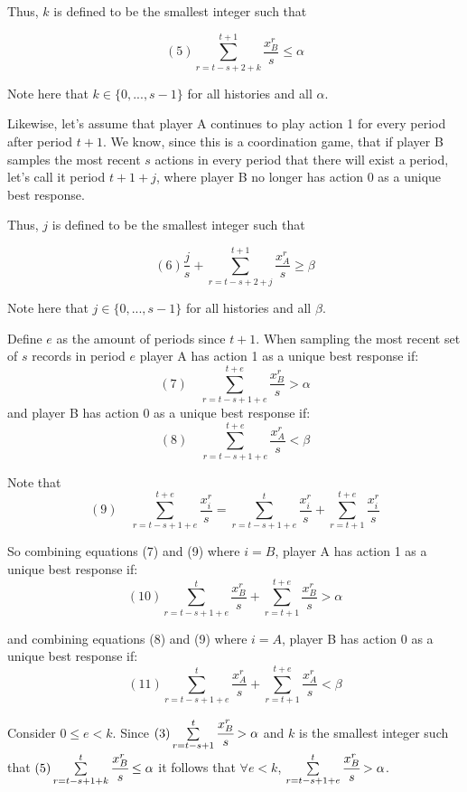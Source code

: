 \documentclass{article}
\begin{document}
Thus, $k$ is defined to be the smallest integer such that

$$(5) \sum\limits_{r=t-s+2+k}^{t+1} \frac{x^r_B}{s} \leq \alpha$$

Note here that $k \in \{0,...,s-1\}$ for all histories and all $\alpha$.

\vskip12pt

Likewise, let's assume that player A continues to play action 1 for every period after period $t+1$. We know, since this is a coordination game, that if player B samples the most recent $s$ actions in every period that there will exist a period, let's call it period $t+1+j$, where player B no longer has action 0 as a unique best response.

\vskip12pt

Thus, $j$ is defined to be the smallest integer such that

$$(6) \frac{j}{s}+\sum\limits_{r=t-s+2+j}^{t+1} \frac{x^r_A}{s} \geq \beta$$

Note here that $j \in \{0,...,s-1\}$ for all histories and all $\beta$.

\vskip12pt

Define $e$ as the amount of periods since $t+1$. When sampling the most recent set of $s$ records in period $e$ player A has action 1 as a unique best response if: 
$$(7) \hspace{12pt} \sum\limits_{r=t-s+1+e}^{t+e} \frac{x^r_B}{s} > \alpha$$
and player B has action 0 as a unique best response if:
$$(8) \hspace{12pt} \sum\limits_{r=t-s+1+e}^{t+e} \frac{x^r_A}{s} < \beta$$

Note that
$$(9) \hspace{12pt} \sum\limits_{r=t-s+1+e}^{t+e} \frac{x^r_i}{s} = \sum\limits_{r=t-s+1+e}^{t}\frac{x^r_i}{s}+\sum\limits_{r=t+1}^{t+e} \frac{x^r_i}{s}$$

So combining equations (7) and (9) where $i=B$, player A has action 1 as a unique best response if: 
$$(10) \sum\limits_{r=t-s+1+e}^{t}\frac{x^r_B}{s}+\sum\limits_{r=t+1}^{t+e} \frac{x^r_B}{s} > \alpha$$

and combining equations (8) and (9) where $i=A$, player B has action 0 as a unique best response if:
$$(11) \sum\limits_{r=t-s+1+e}^{t}\frac{x^r_A}{s}+\sum\limits_{r=t+1}^{t+e} \frac{x^r_A}{s} < \beta$$

\vskip18pt

Consider $0 \leq e<k$. Since $(3) \sum\limits_{r=t-s+1}^{t} \cfrac{x^r_B}{s} > \alpha$ and $k$ is the smallest integer such that $(5) \sum\limits_{r=t-s+1+k}^{t} \cfrac{x^r_B}{s} \leq \alpha$ it follows that $\forall e<k$, $\sum\limits_{r=t-s+1+e}^{t} \cfrac{x^r_B}{s} > \alpha$.
\end{document}
